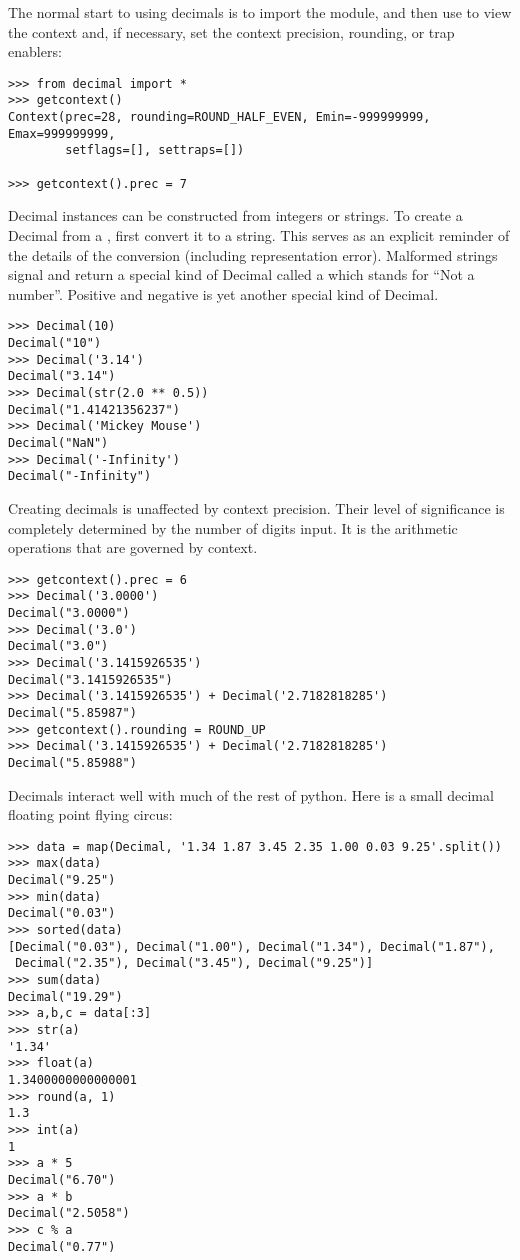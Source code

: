 The normal start to using decimals is to import the module, and then use
 to view the context and, if necessary, set the context
precision, rounding, or trap enablers:

\begin{verbatim}
>>> from decimal import *
>>> getcontext()
Context(prec=28, rounding=ROUND_HALF_EVEN, Emin=-999999999, Emax=999999999,
        setflags=[], settraps=[])

>>> getcontext().prec = 7
\end{verbatim}

Decimal instances can be constructed from integers or strings.  To create a
Decimal from a , first convert it to a string.  This serves as an
explicit reminder of the details of the conversion (including representation
error).  Malformed strings signal  and return a
special kind of Decimal called a  which stands for ``Not a
number''. Positive and negative  is yet another special
kind of Decimal.             

\begin{verbatim}
>>> Decimal(10)
Decimal("10")
>>> Decimal('3.14')
Decimal("3.14")
>>> Decimal(str(2.0 ** 0.5))
Decimal("1.41421356237")
>>> Decimal('Mickey Mouse')
Decimal("NaN")
>>> Decimal('-Infinity')
Decimal("-Infinity")
\end{verbatim}

Creating decimals is unaffected by context precision.  Their level of
significance is completely determined by the number of digits input.  It is
the arithmetic operations that are governed by context.

\begin{verbatim}
>>> getcontext().prec = 6
>>> Decimal('3.0000')
Decimal("3.0000")
>>> Decimal('3.0')
Decimal("3.0")
>>> Decimal('3.1415926535')
Decimal("3.1415926535")
>>> Decimal('3.1415926535') + Decimal('2.7182818285')
Decimal("5.85987")
>>> getcontext().rounding = ROUND_UP
>>> Decimal('3.1415926535') + Decimal('2.7182818285')
Decimal("5.85988")
\end{verbatim}

Decimals interact well with much of the rest of python.  Here is a small
decimal floating point flying circus:
    
\begin{verbatim}    
>>> data = map(Decimal, '1.34 1.87 3.45 2.35 1.00 0.03 9.25'.split())
>>> max(data)
Decimal("9.25")
>>> min(data)
Decimal("0.03")
>>> sorted(data)
[Decimal("0.03"), Decimal("1.00"), Decimal("1.34"), Decimal("1.87"),
 Decimal("2.35"), Decimal("3.45"), Decimal("9.25")]
>>> sum(data)
Decimal("19.29")
>>> a,b,c = data[:3]
>>> str(a)
'1.34'
>>> float(a)
1.3400000000000001
>>> round(a, 1)
1.3
>>> int(a)
1
>>> a * 5
Decimal("6.70")
>>> a * b
Decimal("2.5058")
>>> c % a
Decimal("0.77")
\end{verbatim}

